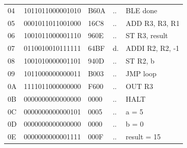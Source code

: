 \begin{tcolorbox}[stepbox, title={Instruction 28 \hfill ticks 82 to 84 \quad HALT}]
{\begin{tabular}{@{}lllll@{}}
04 & 1011011000001010 & B60A & .. & BLE done\\
05 & 0001011011001000 & 16C8 & .. & ADD R3, R3, R1\\
06 & 1001011000001110 & 960E & .. & ST R3, result\\
07 & 0110010010111111 & 64BF & d. & ADDI R2, R2, -1\\
08 & 1001010000001101 & 940D & .. & ST R2, b\\
09 & 1011000000000011 & B003 & .. & JMP loop\\
0A & 1111011000000000 & F600 & .. & OUT R3\\
0B & 0000000000000000 & 0000 & .. & HALT\\
\rowcolor{datac}0C & 0000000000000101 & 0005 & .. & a = 5\\
\rowcolor{datac}0D & 0000000000000000 & 0000 & .. & b = 0\\
\rowcolor{datac}0E & 0000000000001111 & 000F & .. & result = 15\\
\end{tabular}}
\end{tcolorbox}\par\vspace{3pt}

